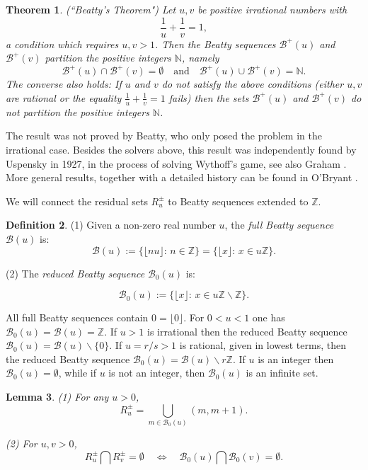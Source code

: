 \documentclass[12pt,letterpaper, reqno]{amsart}
\newtheorem{thm}{Theorem}[section]
\newtheorem{lem}[thm]{Lemma}
\theoremstyle{definition}
\newtheorem{defi}[thm]{Definition}
\theoremstyle{remark}
\newcommand{\ZZ}{\ensuremath{\mathbb{Z}}}
\newcommand{\NN}{\mathbb{N}}
\newcommand{\R}{{R}}
\newcommand{\sB}{{\mathcal B}}
\newcommand{\floor}[1]{\lfloor{#1}\rfloor}
\begin{document}
\begin{thm}\label{thm:44} {\em (``Beatty's Theorem") }
Let $u, v$ be positive irrational numbers with 
$$
\frac{1}{u} + \frac{1}{v} =1,
$$
 a condition which requires $u, v >1$. 
Then the Beatty sequences $\sB^{+}(u)$ and $\sB^{+}(v)$
partition the positive integers $\NN$, namely
$$
\sB^{+}(u) \cap \sB^{+}(v) = \emptyset \quad \mbox{and} \quad \sB^{+}(u) \cup \sB^{+}(v) = \NN.
$$
The converse also holds: If $u$ and $v$ do not satisfy the above conditions (either $u,v$ are rational or the equality $\frac1u + \frac1v = 1$ fails) then the sets $\sB^{+}(u)$ and $\sB^{+}(v)$  do not partition the positive integers $\NN$.
\end{thm}

The result was not proved by Beatty, who only posed the problem in the irrational case.
Besides the solvers above, this result was  independently found  by Uspensky \cite{Usp27} in 1927, in the process of
solving Wythoff's game, see also Graham \cite{Gr63}. 
 More general results, together  with a detailed history can be found in O'Bryant \cite{OB03}.

We  will connect the residual sets $\R_u^{\pm}$ to Beatty sequences extended to  $\ZZ$.

\begin{defi}\label{def:45}
 (1) Given a non-zero real number $u$, the {\it  full Beatty sequence} $\sB(u)$
is:
$$
\sB(u) := \{ \lfloor n u \rfloor: \,  n \in \ZZ \} = \{ \lfloor x \rfloor: \,  x \in u\ZZ \} .
$$

(2) The  {\it reduced  Beatty sequence} $\sB_0(u)$ is: 

$$
\sB_0(u) := \{ \floor x : \,  x \in u\ZZ \smallsetminus \ZZ\} .
$$
\end{defi}

All full Beatty sequences contain $0 = \floor 0$. For $0 < u<1$ one  has $\sB_0(u) = \sB(u)= \ZZ$. 
If  $u>1$ is irrational   then  the reduced Beatty sequence
$\sB_0(u) = \sB(u) \smallsetminus \{0\}.$ If $u={r}/{s}>1$ is rational, 
given in lowest terms, then the reduced Beatty sequence
$\sB_0(u) = \sB(u) \smallsetminus r\ZZ.$ 
If   $u$ is an integer then $\sB_0(u) = \emptyset$, while if $u$ is not an integer, then $\sB_0(u)$ is an infinite set.

\begin{lem}\label{lem:46}
(1) For any $u >0$,
$$
\R_u^{\pm} = \bigcup_{m \in \sB_0(u)} ( m, m+1) .
$$

(2) For $u,v>0$,
\begin{equation}
\R_u^{\pm} \bigcap \R_v^{\pm} = \emptyset \quad \Leftrightarrow \quad \sB_0(u) \bigcap \sB_0(v) = \emptyset.
\end{equation}
\end{lem}
\end{document}
